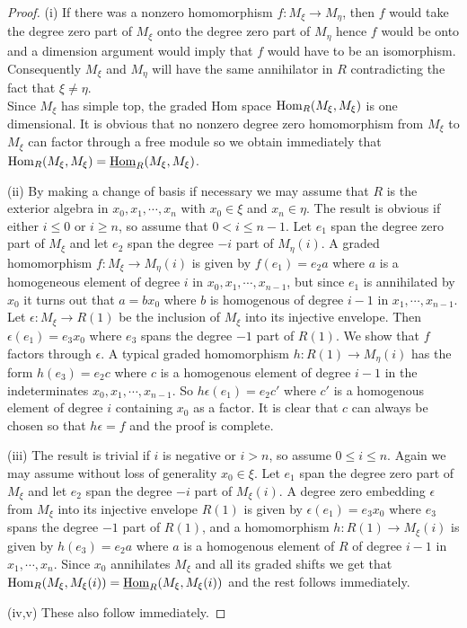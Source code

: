 \documentclass[10pt]{amsart}
\begin{document}
\begin{proof}

\noindent (i) If there was a nonzero homomorphism $f\colon M_{\xi}\rightarrow M_{\eta}$, then $f$ would 
take the degree zero part of $M_{\xi}$ onto the degree zero part of $M_{\eta}$ 
hence $f$ would be onto and a dimension argument would imply that $f$ would have to
 be an isomorphism. Consequently $M_{\xi}$ and $M_{\eta}$ will have the same annihilator 
in $R$ contradicting the fact that $\xi\neq\eta$.\\
Since $M_{\xi}$ has simple top, the graded Hom space $\operatorname{Hom}_R(M_{\xi},M_{\xi})$ is one dimensional.
It is obvious 
that no nonzero degree zero homomorphism from $M_{\xi}$ to $M_{\xi}$ can factor through 
a free module so we obtain immediately that $\operatorname{Hom}_R(M_{\xi},M_{\xi})=\underline{\operatorname{Hom}}_R(M_{\xi},M_{\xi})$. 

\medskip
\noindent (ii) By making a change of basis if necessary we may assume that
 $R$ is 
the exterior algebra in $x_0, x_1,\cdots,  x_n$ with $x_0\in\xi$ and $x_n\in\eta$. The result is obvious if 
either $i\le 0$ or $i\ge n$, so assume that $0<i\le n-1$. Let $e_1$ span the degree 
zero part of $M_{\xi}$ and let $e_2$ span the degree $-i$ part of $M_{\eta}(i)$. 
A graded homomorphism $f\colon M_{\xi}\rightarrow M_{\eta}(i)$  is given by $f(e_1)=e_2a$
where $a$ is a homogeneous element of degree $i$ in $x_0, x_1,\cdots, x_{n-1}$, but 
since $e_1$ is annihilated by $x_0$ it turns out that $a=bx_0$ where $b$ is homogenous 
of degree $i-1$ in $x_1,\cdots, x_{n-1}$. 
Let $\epsilon\colon M_{\xi}\rightarrow R(1)$ 
be the inclusion of $M_{\xi}$ into its injective envelope. Then $\epsilon (e_1)= e_3x_0$
where $e_3$ spans the degree $-1$ part of $R(1)$.  We show that $f$ factors through $\epsilon$. 
A typical graded homomorphism $h\colon R(1)\rightarrow M_{\eta}(i)$ has the 
form $h(e_3)=e_2c$ where $c$ is a homogenous element of degree $i-1$ in the 
indeterminates $x_0, x_1,\cdots, x_{n-1}$. So $h\epsilon (e_1)= e_2c'$ where $c'$ is 
a homogenous element of degree $i$ containing $x_0$ as a factor. It is clear 
that $c$ can always be chosen so that $h\epsilon=f$ and the proof is complete.

\medskip

\noindent (iii) The result is trivial if $i$ is negative or $i>n$, so 
assume $0\le i\le n$. Again we may assume without loss of generality $x_0\in \xi$.
 Let $e_1$ span 
the degree zero part of $M_{\xi}$ and let $e_2$ span the degree $-i$ part of $M_{\xi}(i)$. 
A degree zero embedding $\epsilon$ from $M_{\xi}$ into its injective envelope $R(1)$ is 
given by $\epsilon(e_1)= e_3x_0$ where $e_3$ spans the degree $-1$ part  of $R(1)$, and a 
homomorphism $h\colon R(1)\rightarrow M_{\xi}(i)$ is given by $h(e_3)=e_2a$ where $a$ is 
a homogenous element of $R$ of degree $i-1$ in $x_1,\cdots, x_n$. Since $x_0$ 
annihilates $M_{\xi}$ and all its graded shifts we get that 
$\operatorname{Hom}_R(M_{\xi},M_{\xi}(i))=\underline{\operatorname{Hom}}_R(M_{\xi},M_{\xi}(i))$ and the rest follows immediately.

\medskip
\noindent (iv,v) These also follow immediately.
\end{proof}
\end{document}
